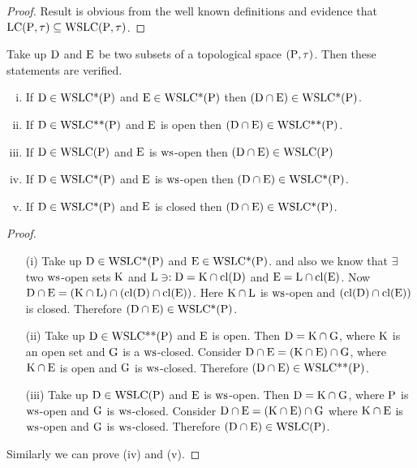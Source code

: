 \begin{proof}
Result is obvious from the well known definitions and evidence that $\mathrm{LC}(\mathrm{P},\tau) \subseteq \mathrm{WSLC}(\mathrm{P},\tau)$.
\end{proof}

\begin{thm}\label{thm6.4.11}
Take up $\mathrm{D}$ and $\mathrm{E}$ be two subsets of a topological space $(\mathrm{P}, \tau)$. Then these statements are verified.
\begin{enumerate}[(i)]
\item If $\mathrm{D} \in \mathrm{WSLC} \text{*} (\mathrm{P})$ and $\mathrm{E} \in \mathrm{WSLC} \text{*} (\mathrm{P})$ then $(\mathrm{D} \cap \mathrm{E}) \in \mathrm{WSLC} \text{*} (\mathrm{P})$.
\item If $\mathrm{D} \in \mathrm{WSLC}\text{{*}{*}}(\mathrm{P})$ and $\mathrm{E}$ is open then $(\mathrm{D} \cap \mathrm{E}) \in \mathrm{WSLC}\text{{*}{*}}(\mathrm{P})$.
\item If $\mathrm{D} \in \mathrm{WSLC}(\mathrm{P})$ and $\mathrm{E}$ is $\mathrm{ws}$-open then $(\mathrm{D} \cap \mathrm{E}) \in \mathrm{WSLC}(\mathrm{P})$
\item If $\mathrm{D} \in \mathrm{WSLC}\text{*}(\mathrm{P})$ and $\mathrm{E}$ is $\mathrm{ws}$-open then $(\mathrm{D} \cap \mathrm{E}) \in \mathrm{WSLC}\text{*}(\mathrm{P})$.
\item If $\mathrm{D} \in \mathrm{WSLC}\text{*}(\mathrm{P})$ and $\mathrm{E}$ is closed then $(\mathrm{D} \cap \mathrm{E}) \in \mathrm{WSLC}\text{*}(\mathrm{P})$.
\end{enumerate}
\end{thm}

\begin{proof}
\begin{itemize}
\item[(i)] Take up $\mathrm{D} \in \mathrm{WSLC}\text{*}(\mathrm{P})$ and $\mathrm{E} \in \mathrm{WSLC}\text{*}(\mathrm{P})$. and also we know that $\exists$ two $\mathrm{ws}$-open sets $\mathrm{K}$ and $\mathrm{L} \ni: \mathrm{D} = \mathrm{K} \cap \mathrm{cl}(\mathrm{D})$ and $\mathrm{E} = \mathrm{L} \cap \mathrm{cl}(\mathrm{E})$. Now $\mathrm{D} \cap \mathrm{E} = (\mathrm{K} \cap \mathrm{L}) \cap (\mathrm{cl}(\mathrm{D}) \cap \mathrm{cl}(\mathrm{E}))$. Here $\mathrm{K} \cap \mathrm{L}$ is $\mathrm{ws}$-open and $(\mathrm{cl}(\mathrm{D}) \cap \mathrm{cl}(\mathrm{E}))$ is closed. Therefore $(\mathrm{D} \cap \mathrm{E}) \in \mathrm{WSLC}\text{*}(\mathrm{P})$.

\item[(ii)] Take up $\mathrm{D} \in \mathrm{WSLC}\text{{*}{*}}(\mathrm{P})$ and $\mathrm{E}$ is open. Then $\mathrm{D} = \mathrm{K} \cap \mathrm{G}$, where $\mathrm{K}$ is an open set and $\mathrm{G}$ is a $\mathrm{ws}$-closed. Consider $\mathrm{D} \cap \mathrm{E} = (\mathrm{K} \cap \mathrm{E}) \cap \mathrm{G}$, where $\mathrm{K} \cap \mathrm{E}$ is open and $\mathrm{G}$ is $\mathrm{ws}$-closed. Therefore $(\mathrm{D} \cap \mathrm{E}) \in \mathrm{WSLC}\text{{*}{*}}(\mathrm{P})$.

\item[(iii)] Take up $\mathrm{D} \in \mathrm{WSLC}(\mathrm{P})$ and $\mathrm{E}$ is $\mathrm{ws}$-open. Then $\mathrm{D} = \mathrm{K} \cap \mathrm{G}$, where $\mathrm{P}$ is $\mathrm{ws}$-open and $\mathrm{G}$ is $\mathrm{ws}$-closed. Consider $\mathrm{D} \cap \mathrm{E} = (\mathrm{K} \cap \mathrm{E}) \cap \mathrm{G}$ where $\mathrm{K} \cap \mathrm{E}$ is $\mathrm{ws}$-open and $\mathrm{G}$ is $\mathrm{ws}$-closed. Therefore $(\mathrm{D} \cap \mathrm{E}) \in \mathrm{WSLC}(\mathrm{P})$.
\end{itemize}
Similarly we can prove (iv) and (v).
\end{proof}
